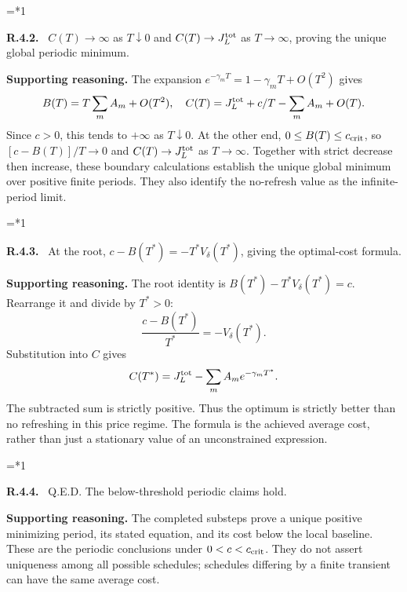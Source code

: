 \documentclass[12pt,letterpaper]{article}
\newenvironment{proofstep}[2]{%
  \begin{list}{}{\leftmargin=\dimexpr 0.17in*#2\relax%
  \setlength{\rightmargin}{0pt}\setlength{\topsep}{5pt}\setlength{\parsep}{2pt}}%
  \item[]\textbf{\textcolor{ink}{#1.}}\ }{\end{list}}
\begin{document}
\begin{proofstep}{R.4.2}{1}
\label{step:R.4.2}
$C(T)\to\infty$ as $T\downarrow0$ and $C(T)\to J_L^{\rm tot}$ as $T\to\infty$, proving the unique global periodic minimum.

\textbf{Supporting reasoning.}
The expansion $e^{-\gamma_mT}=1-\gamma_mT+O(T^2)$ gives
\[
B(T)=T\sum_mA_m+O(T^2),
\quad C(T)=J_L^{\rm tot}+c/T-\sum_mA_m+O(T).
\]
Since $c>0$, this tends to $+\infty$ as $T\downarrow0$. At the other end, $0\le B(T)\le c_{\rm crit}$, so $[c-B(T)]/T\to0$ and $C(T)\to J_L^{\rm tot}$ as $T\to\infty$. Together with strict decrease then increase, these boundary calculations establish the unique global minimum over positive finite periods. They also identify the no-refresh value as the infinite-period limit.
\par{}
\end{proofstep}

\begin{proofstep}{R.4.3}{1}
\label{step:R.4.3}
At the root, $c-B(T^*)=-T^*V_\delta(T^*)$, giving the optimal-cost formula.

\textbf{Supporting reasoning.}
The root identity is $B(T^*)-T^*V_\delta(T^*)=c$. Rearrange it and divide by $T^*>0$:
\[
\frac{c-B(T^*)}{T^*}=-V_\delta(T^*).
\]
Substitution into $C$ gives
\[
C(T^*)=J_L^{\rm tot}-\sum_mA_m e^{-\gamma_mT^*}.
\]
The subtracted sum is strictly positive. Thus the optimum is strictly better than no refreshing in this price regime. The formula is the achieved average cost, rather than just a stationary value of an unconstrained expression.
\par{}
\end{proofstep}

\begin{proofstep}{R.4.4}{1}
\label{step:R.4.4}
Q.E.D. The below-threshold periodic claims hold.

\textbf{Supporting reasoning.}
The completed substeps prove a unique positive minimizing period, its stated equation, and its cost below the local baseline. These are the periodic conclusions under $0<c<c_{\rm crit}$. They do not assert uniqueness among all possible schedules; schedules differing by a finite transient can have the same average cost.
\par{}
\end{proofstep}
\end{document}
